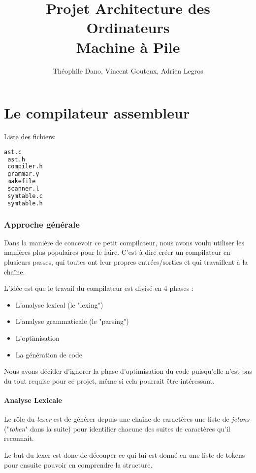 \documentclass[14pt,a4paper]{article}
\author{Théophile Dano, Vincent Gouteux, Adrien Legros}
\title{Projet Architecture des Ordinateurs \\ Machine à Pile}
\begin{document}
	\maketitle
	\newpage
	
	\part{Le compilateur assembleur}
	
	Liste des fichiers:
	
	\begin{lstlisting}[frame=simple,language=Bash]
 ast.c
 ast.h
 compiler.h
 grammar.y
 makefile
 scanner.l
 symtable.c
 symtable.h
	\end{lstlisting}

	\section{Approche générale}

	Dans la manière de concevoir ce petit compilateur, nous avons voulu utiliser les manières plus populaires pour le faire. C'est-à-dire créer un compilateur en plusieurs passes, qui toutes ont leur propres entrées/sorties et qui travaillent à la chaîne.

	L'idée est que le travail du compilateur est divisé en 4 phases :
	
	\begin{itemize}
		\item L'analyse lexical (le "lexing")  
		\item L'analyse grammaticale (le "parsing")
		\item L'optimisation
		\item La génération de code
	\end{itemize}

	Nous avons décider d'ignorer la phase d'optimisation du code puisqu'elle n'est pas du tout requise pour ce projet, même si cela pourrait être intéressant.
	
	\subsection{Analyse Lexicale}

	Le rôle du \textit{lexer} est de générer depuis une chaîne de caractères une liste de \textit{jetons} ("\textit{token}" dans la suite) pour identifier chacune des suites de caractères qu'il reconnait.
	
	Le but du lexer est donc de découper ce qui lui est donné en une liste de tokens pour ensuite pouvoir en comprendre la structure.
	
\end{document}
